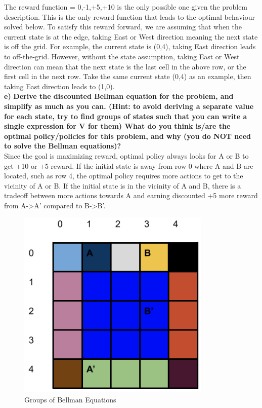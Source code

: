 \documentclass[11pt]{article}
\begin{document}
\noindent
The reward function = {0,-1,+5,+10} is the only possible one given the problem
description. This is the only reward function that leads to the optimal
behaviour solved below. To satisfy this reward forward, we are assuming that
when the current state is at the edge, taking East or West direction meaning the
next state is off the grid. For example, the current state is (0,4), taking East
direction leads to off-the-grid. However, without the state assumption, taking
East or West direction can mean that the next state is the last cell in the
above row, or the first cell in the next row. Take the same current state (0,4)
as an example, then taking East direction leads to (1,0). 
\\

\noindent
\textbf{e)}
\noindent
\textbf{Derive the discounted Bellman equation for the problem, and simplify
as much as you can. (Hint: to avoid deriving a separate value for each state,
try to find groups of states such that you can write a single expression for V for
them) What do you think is/are the optimal policy/policies for this problem,
and why (you do NOT need to solve the Bellman equations)?}
\\

\noindent
Since the goal is maximizing reward, optimal policy always looks for A or B to
get +10 or +5 reward. If the initial state is away from row 0 where A and B are
located, such as row 4, the optimal policy requires more actions to get to the
vicinity of A or B. If the initial state is in the vicinity of A and B, there is
a tradeoff between more actions towards A and earning discounted +5 more reward
from A->A’ compared to B->B’.
\\

\begin{figure}[h]
\includegraphics[scale=0.5]{bellman_groups}
\centering
\caption{Groups of Bellman Equations}
\end{figure}
\end{document}
